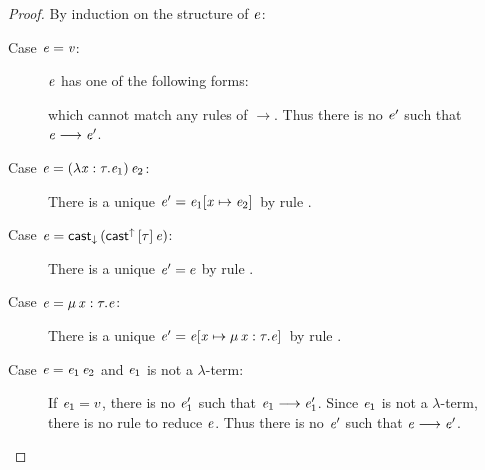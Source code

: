 \begin{proof}
	By induction on the structure of $\mathit{e}$:
	\begin{description}
		\item[Case $\mathit{e}  =  \mathit{v}$:] $\mathit{e}$ has one of the following forms:
		\begin{inparaenum}[(1)]
		    \item $\star$,
			\item $\lambda  \ottmv{x}  \ottsym{:}  \tau  \ottsym{.}  \ottnt{e}$,
			\item $\Pi \, \ottmv{x}  \ottsym{:}  \tau_{{\mathrm{1}}}  \ottsym{.}  \tau_{{\mathrm{2}}}$,
			\item $\kw{cast}^{\uparrow} \, \ottsym{[}  \tau  \ottsym{]} \,  \ottnt{e}$,
		\end{inparaenum}
		which cannot match any rules of $ \longrightarrow $. Thus there is no $\mathit{e}'$ such
that $\mathit{e}  \longrightarrow  \mathit{e'}$.
		\item[Case $\mathit{e}=(  \lambda  \mathit{x}  :  \tau  .  \mathit{e_{{\mathrm{1}}}}  ) \, \mathit{e_{{\mathrm{2}}}}$:] There is a unique $\mathit{e}'=\mathit{e_{{\mathrm{1}}}}  [  \mathit{x}  \mapsto  \mathit{e_{{\mathrm{2}}}}  ] \,$ by rule .
		\item[Case $\mathit{e}=\mathsf{cast}_{\downarrow} \, (  \mathsf{cast}^{\uparrow} \, [  \tau  ] \,  \mathit{e}  )$:] There is a unique $\mathit{e}'=e$
by rule .
		\item[Case $\mathit{e}=\mu \, \mathit{x}  :  \tau  .  \mathit{e}$:] There is a unique $\mathit{e}'=\mathit{e}  [  \mathit{x}  \mapsto  \mu \, \mathit{x}  :  \tau  .  \mathit{e}  ] \,$ by rule .
		\item[Case $\mathit{e}=\mathit{e_{{\mathrm{1}}}} \, \mathit{e_{{\mathrm{2}}}}$ and $\mathit{e_{{\mathrm{1}}}}$ is not a $\lambda$-term:] If
$\mathit{e_{{\mathrm{1}}}}=v$, there is no $\mathit{e'_{{\mathrm{1}}}}$ such that $\mathit{e_{{\mathrm{1}}}}  \longrightarrow  \mathit{e'_{{\mathrm{1}}}}$. Since $\mathit{e_{{\mathrm{1}}}}$ is
not a $\lambda$-term, there is no rule to reduce $\mathit{e}$. Thus there is no
$\mathit{e}'$ such that $\mathit{e}  \longrightarrow  \mathit{e'}$.
		

\end{description}
\end{proof}
